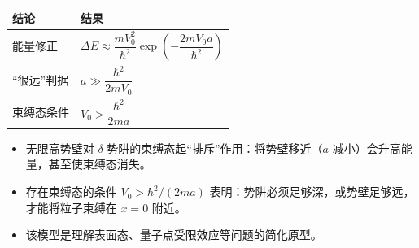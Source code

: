 \begin{formulabox}[答案汇总]
\begin{center}
\begin{tabular}{ll}
\toprule
\textbf{结论} & \textbf{结果} \\
\midrule
能量修正 & $\Delta E\approx\dfrac{mV_0^2}{\hbar^2}\exp\left(-\dfrac{2mV_0 a}{\hbar^2}\right)$ \\
``很远''判据 & $a\gg\dfrac{\hbar^2}{2mV_0}$ \\
束缚态条件 & $V_0>\dfrac{\hbar^2}{2ma}$ \\
\bottomrule
\end{tabular}
\end{center}
\end{formulabox}

\begin{insightbox}[物理图像]
\begin{itemize}
    \item 无限高势壁对 $\delta$ 势阱的束缚态起``排斥''作用：将势壁移近（$a$ 减小）会升高能量，甚至使束缚态消失。
    \item 存在束缚态的条件 $V_0>\hbar^2/(2ma)$ 表明：势阱必须足够深，或势壁足够远，才能将粒子束缚在 $x=0$ 附近。
    \item 该模型是理解表面态、量子点受限效应等问题的简化原型。
\end{itemize}
\end{insightbox}
